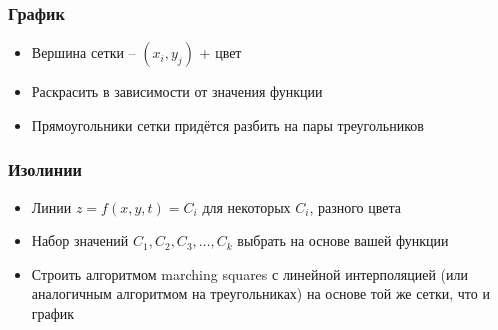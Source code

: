 \documentclass{beamer}
\begin{document}
\begin{frame}[fragile]
\frametitle{График}
\begin{itemize}
\item Вершина сетки -- \begin{math}(x_i, y_j)\end{math} + цвет
\item Раскрасить в зависимости от значения функции
\pause
\item Прямоугольники сетки придётся разбить на пары треугольников
\end{itemize}
\end{frame}

\begin{frame}[fragile]
\frametitle{Изолинии}
\begin{itemize}
\item Линии \begin{math}z = f(x,y,t) = C_i\end{math} для некоторых \begin{math}C_i\end{math}, разного цвета
\item Набор значений \begin{math}C_1, C_2, C_3, \dots, C_k\end{math} выбрать на основе вашей функции
\pause
\item Строить алгоритмом marching squares с линейной интерполяцией (или аналогичным алгоритмом на треугольниках) на основе той же сетки, что и график
\end{itemize}
\end{frame}
\end{document}
